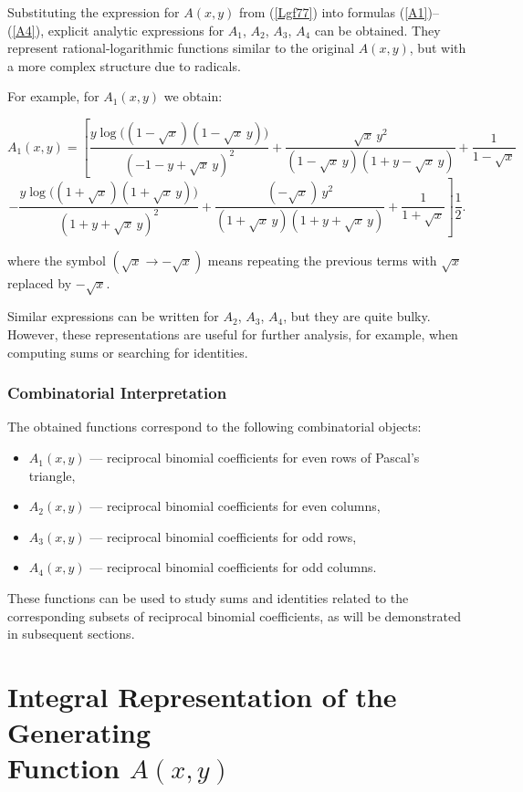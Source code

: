 \documentclass[12pt]{article}
\begin{document}
Substituting the expression for $A(x,y)$ from (\ref{Lgf77}) into formulas (\ref{A1})–(\ref{A4}), explicit analytic expressions for $A_1$, $A_2$, $A_3$, $A_4$ can be obtained. They represent rational-logarithmic functions similar to the original $A(x,y)$, but with a more complex structure due to radicals.

For example, for $A_1(x,y)$ we obtain:


\[
A_1(x,y) =\! \left[ 
\frac{y \log\bigl((1\!-\sqrt{x})(1\!-\sqrt{x}\,y)\bigr)}{(-1 - y+ \sqrt{x}\,y)^2}\!
+\! \frac{\sqrt{x}\,y^2}{(1\!-\sqrt{x}\,y)(1\! + y\! - \sqrt{x}\,y)}
+ \frac{1}{1\!-\sqrt{x}} \right.
\]
\[
\left. 
- \frac{y \log\bigl((1+\sqrt{x})(1+\sqrt{x}\,y)\bigr)}{(1 + y + \sqrt{x}\,y)^2}
+ \frac{(-\sqrt{x})\,y^2}{(1+\sqrt{x}\,y)(1 + y + \sqrt{x}\,y)}
+ \frac{1}{1+\sqrt{x}} \right]\frac{1}{2}. 
\]

where the symbol $(\sqrt{x} \to -\sqrt{x})$ means repeating the previous terms with $\sqrt{x}$ replaced by $-\sqrt{x}$.

Similar expressions can be written for $A_2$, $A_3$, $A_4$, but they are quite bulky. However, these representations are useful for further analysis, for example, when computing sums or searching for identities.

\subsubsection{Combinatorial Interpretation}

The obtained functions correspond to the following combinatorial objects:
\begin{itemize}
\item $A_1(x,y)$ — reciprocal binomial coefficients for even rows of Pascal's triangle,
\item $A_2(x,y)$ — reciprocal binomial coefficients for even columns,
\item $A_3(x,y)$ — reciprocal binomial coefficients for odd rows,
\item $A_4(x,y)$ — reciprocal binomial coefficients for odd columns.
\end{itemize}

These functions can be used to study sums and identities related to the corresponding subsets of reciprocal binomial coefficients, as will be demonstrated in subsequent sections.

\section{Integral Representation of the Generating\\ Function \(A(x,y)\)}\label{sec:integral-repr}
\end{document}
